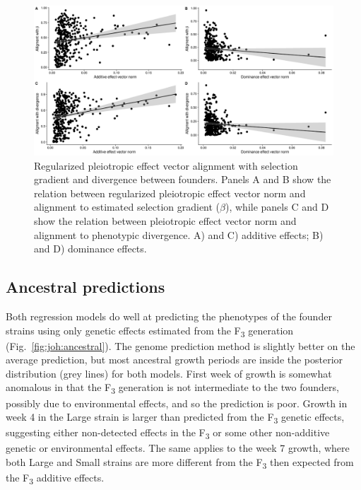 \begin{refsection}
\begin{figure}
\includegraphics[width=\linewidth]{chapter_JoH-Melo_etal/media/growth_effect_aligment_regressions_GP.png}
\caption[Pleiotropic effect vector alignment]{Regularized pleiotropic effect vector alignment with selection
gradient and divergence between founders. Panels A and B show the relation between regularized pleiotropic effect vector norm and alignment to estimated selection gradient ($\beta$), while panels C and D show the relation between
pleiotropic effect vector norm and alignment to phenotypic divergence. A)
and C) additive effects; B) and D) dominance effects.}
\label{fig:joh:alignmentGP}
\end{figure}

\subsection{Ancestral predictions}

Both regression models do well at predicting the phenotypes of the
founder strains using only genetic effects estimated from the
F\textsubscript{3} generation (Fig.~\ref{fig:joh:ancestral}). The genome prediction method is
slightly better on the average prediction, but most ancestral growth
periods are inside the posterior distribution (grey lines) for both
models. First week of growth is somewhat anomalous in that the
F\textsubscript{3} generation is not intermediate to the two founders,
possibly due to environmental effects, and so the prediction is poor.
Growth in week 4 in the Large strain is larger than predicted from the
F\textsubscript{3} genetic effects, suggesting either non-detected
effects in the F\textsubscript{3} or some other non-additive genetic or
environmental effects. The same applies to the week 7 growth, where both
Large and Small strains are more different from the F\textsubscript{3}
then expected from the F\textsubscript{3} additive effects.


\end{refsection}
